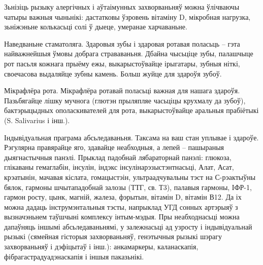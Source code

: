 Зьнізіць рызыку алергічных і аўтаімунных захворваньняў можна ўлічваючы чатыры важныя чыньнікі: дастатковы ўзровень вітаміну D, мікробная нагрузка, зьніжэньне колькасьці солі ў дыеце, умеранае харчаваньне.

Наведваньне стаматоляга.
Здаровыя зубы і здаровая ротавая поласьць – гэта найважнейшыя ўмовы добрага страваваньня. Дбайна чысьціце зубы, палашчыце рот пасьля кожнага прыёму ежы, выкарыстоўвайце ірыгатары, зубныя ніткі, своечасова выдаляйце зубны камень. Больш жуйце для здароўя зубоў.

Мікрафлёра рота.
Мікрафлёра ротавай поласьці важная для нашага здароўя. Пазьбягайце лішку мучнога (глютэн прыляпляе часьціцы крухмалу да зубоў), бактэрыцыдных ополаскивателей для рота, выкарыстоўвайце аральныя прабіётыкі (S. Salivarius і інш.).

Індывідуальная праграма абсьледаваньня.
Таксама на ваш стан уплывае і здароўе. Рэгулярна правярайце яго, здавайце неабходныя, а лепей – пашыраныя дыягнастычныя панэлі. Прыклад падобнай лябараторнай панэлі: глюкоза, глікаваны гемаглабін, інсулін, індэкс інсулінарэзыстэнтнасьці, Алат, Асат, крэатынін, мачавая кіслата, гомацыстэін, ультраадчувальны тэст на С-рэактыўны бялок, гармоны шчытападобнай залозы (ТТГ, св. Т3), палавыя гармоны, ІФР-1, гармон росту, цынк, магній, жалеза, фэрытын, вітамін D, вітамін В12. Да іх можна дадаць інструмэнтальныя тэсты, напрыклад УГД сонных артэрыяў з вызначэньнем таўшчыні комплексу інтым-мэдыя. Пры неабходнасьці можна дапаўняць іншымі абсьледаваньнямі, у залежнасьці ад узросту і індывідуальнай рызыкі (сямейная гісторыя захворваньняў, генэтычныя рызыкі шэрагу захворваньняў і дэфіцытаў і інш.): анкамаркеры, каланаскапія, фібрагастрадуадэнаскапія і іншыя паказьнікі.
